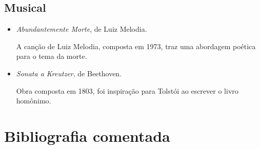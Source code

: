 \documentclass[12pt]{extarticle}
\begin{document}
\subsection {Musical}

\begin{itemize}
\item \emph{Abundantemente Morte}, de Luiz Melodia.

A canção de Luiz Melodia, composta em 1973, traz uma abordagem poética para o tema da morte.

\item \emph{Sonata a Kreutzer}, de Beethoven.

Obra composta em 1803, foi inspiração para Tolstói ao escrever o livro homônimo.
\end{itemize}

\section{Bibliografia comentada}
\end{document}
